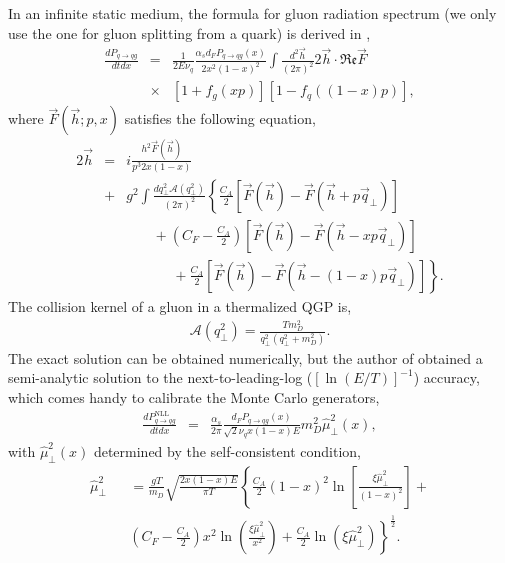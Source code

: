 \documentclass[aps, prc, reprint, amsmath, groupedaddress, nofootinbib]{revtex4-1}
\begin{document}
In an infinite static medium, the formula for gluon radiation spectrum (we only use the one for gluon splitting from a quark) is derived in \cite{Arnold:2002zm,Arnold:2003zc},
\begin{eqnarray}\label{eq:AMY-1}
\nonumber
\frac{dP_{q\rightarrow qg}}{dt dx} &=& \frac{1}{2E\nu_q} \frac{\alpha_s d_F P_{q\rightarrow qg}(x)}{2x^2(1-x)^2}\int\frac{d^2\vec{h}}{(2\pi)^2}2\vec{h}\cdot \mathfrak{Re} \vec{F} \\
&\times& [1+f_g(xp)][1-f_q((1-x)p)],
\end{eqnarray}
where $\vec{F}(\vec{h}; p, x)$ satisfies the following equation,
\begin{eqnarray}\label{eq:AMY-2}
\nonumber
2\vec{h} &=& i\frac{h^2 \vec{F}(\vec{h})}{p^3 2x(1-x)} \\
\nonumber
&+& g^2\int \frac{dq_\perp^2 \mathcal{A}(q_\perp^2)}{(2\pi)^2}\left\{\frac{C_A}{2}\left[\vec{F}(\vec{h}) - \vec{F}(\vec{h}+p\vec{q}_\perp)\right]\right. \\
\nonumber
&& \phantom{ssss} + \left(C_F - \frac{C_A}{2}\right)\left[\vec{F}(\vec{h}) - \vec{F}(\vec{h}-xp\vec{q}_\perp)\right] \\
&& \phantom{sssssss} + \left. \frac{C_A}{2}\left[\vec{F}(\vec{h}) - \vec{F}(\vec{h}-(1-x)p\vec{q}_\perp)\right] \right\}.
\end{eqnarray}
The collision kernel of a gluon in a thermalized QGP is,
\begin{eqnarray}
\mathcal{A}(q_\perp^2) = \frac{T m_D^2}{q_\perp^2(q_\perp^2+m_D^2)}.
\end{eqnarray}
The exact solution can be obtained numerically, but the author of \cite{Arnold:2008zu} obtained a semi-analytic solution to the next-to-leading-log ($[\ln(E/T)]^{-1}$) accuracy, which comes handy to calibrate the Monte Carlo generators,
\begin{eqnarray}\label{eq:AMY-NLL}
\frac{dP_{q\rightarrow qg}^{\textrm{NLL}}}{dt dx} &=& \frac{\alpha_s}{2\pi}\frac{ d_F P_{q\rightarrow qg}(x)}{\sqrt{2}\nu_q x(1-x)E} m_D^2 \hat{\mu}_\perp^2(x),
\end{eqnarray}
with $\hat{\mu}_\perp^2(x)$ determined by the self-consistent condition,
\begin{eqnarray}\label{eq:AMY-sf}
\nonumber
\hat{\mu}_\perp^2 && = \frac{gT}{m_D} \sqrt{\frac{2x(1-x)E}{\pi T}}\left\{
\frac{C_A}{2}(1-x)^2\ln\left[\frac{\xi\hat{\mu}_\perp^2}{(1-x)^2}\right] + \right. \\
&&\left.\left(C_F-\frac{C_A}{2}\right)x^2\ln\left(\frac{\xi\hat{\mu}_\perp^2}{x^2}\right) + \frac{C_A}{2}\ln(\xi\hat{\mu}_\perp^2)\right\}^{\frac{1}{2}}.
\end{eqnarray}
\end{document}
